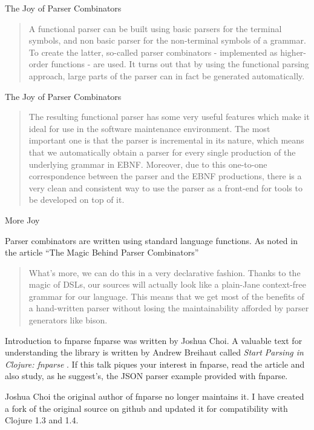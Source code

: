 \documentclass[presentation]{beamer}
\begin{document}
\begin{frame}{The Joy of Parser Combinators}
\begin{quotation}
A functional parser can be built using basic parsers for the terminal
symbols, and non basic parser for the non-terminal symbols of a
grammar. To create the latter, so-called parser combinators -
implemented as higher-order functions - are used. It turns out that by
using the functional parsing approach, large parts of the parser can
in fact be generated automatically.
\end{quotation}
\end{frame}

\begin{frame}{The Joy of Parser Combinators}
\begin{quotation}
 The resulting functional parser has some very useful features which
make it ideal for use in the software maintenance environment. The
most important one is that the parser is incremental in its nature,
which means that we automatically obtain a parser for every single
production of the underlying grammar in EBNF. Moreover, due to this
one-to-one correspondence between the parser and the EBNF productions,
there is a very clean and consistent way to use the parser as a
front-end for tools to be developed on top of it.\cite{Baumann}
\end{quotation}
\end{frame}

\begin{frame}{More Joy}

  Parser combinators are written using standard language functions. As
  noted in the article ``The Magic Behind Parser Combinators''\cite{Spiewak}

\begin{quotation}
  What's more, we can do this in a very declarative fashion.  Thanks
  to the magic of DSLs, our sources will actually look like a
  plain-Jane context-free grammar for our language.  This means that
  we get most of the benefits of a hand-written parser without losing
  the maintainability afforded by parser generators like bison.
\end{quotation}
\end{frame}

\begin{frame}{Introduction to fnparse}
  fnparse \cite{Choi} was written by Joshua Choi. A valuable text for
  understanding the library is written by Andrew Breihaut called
  \emph{Start Parsing in Clojure: fnparse} \cite{Breihaut}.  If this
  talk piques your interest in fnparse, read the article and also
  study, as he suggest's, the JSON parser example provided with
  fnparse.

  Joshua Choi the original author of fnparse no longer maintains it. I
  have created a fork of the original source on github and updated it
  for compatibility with Clojure 1.3 and 1.4.
\end{frame}
\end{document}

